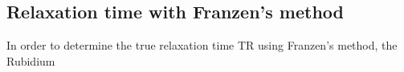 \documentclass{article}
\begin{document}
\subsection{Relaxation time with Franzen’s method}
In order to determine the true relaxation time TR using Franzen’s method, the Rubidium
\end{document}
